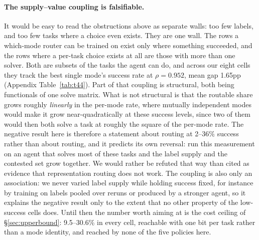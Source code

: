  \paragraph{The supply--value coupling is falsifiable.} It would be easy to read the obstructions above as separate walls: too few labels, and too few tasks where a choice even exists. They are one wall. The rows a which-mode router can be trained on exist only where something succeeded, and the rows where a per-task choice exists at all are those with more than one solver. Both are subsets of the tasks the agent can do, and across our eight cells they track the best single mode's success rate at $\rho = 0.952$, mean gap 1.65pp (Appendix Table~\ref{tab:t44}). Part of that coupling is structural, both being functionals of one solve matrix. What is not structural is that the routable share grows roughly \emph{linearly} in the per-mode rate, where mutually independent modes would make it grow near-quadratically at these success levels, since two of them would then both solve a task at roughly the square of the per-mode rate. The negative result here is therefore a statement about routing at 2--36\% success rather than about routing, and it predicts its own reversal: run this measurement on an agent that solves most of these tasks and the label supply and the contested set grow together. We would rather be refuted that way than cited as evidence that representation routing does not work. The coupling is also only an association: we never varied label supply while holding success fixed, for instance by training on labels pooled over reruns or produced by a stronger agent, so it explains the negative result only to the extent that no other property of the low-success cells does. Until then the number worth aiming at is the cost ceiling of \S\ref{sec:upperbound}: 9.5--30.6\% in every cell, reachable with one bit per task rather than a mode identity, and reached by none of the five policies here.
